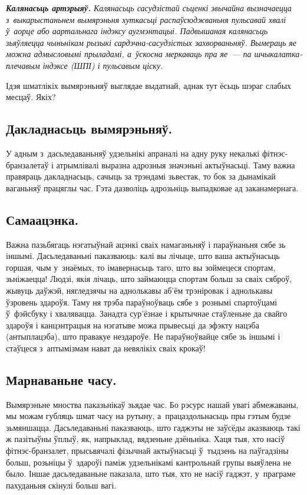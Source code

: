 \emph{\textbf{Калянасьць артэрыяў.} Калянасьць сасудзістай сьценкі звычайна вызначаецца з~выкарыстаньнем вымярэньня хуткасьці распаўсюджваньня пульсавай хвалі ў~аорце або аартальнага індэксу аугмэнтацыі. Падвышаная калянасьць зьяўляецца чыньнікам рызыкі сардэчна-сасудзістых захворваньняў. Вымераць яе можна адмысловымі прыладамі, а~ўскосна меркаваць пра яе~--- па шчыкалатка-плечавым індэксе (ШПІ) і пульсавым ціску.}

Ідэя шматлікіх вымярэньняў выглядае выдатнай, аднак тут ёсьць шэраг слабых месцаў. Якіх?

\subsection*{Дакладнасьць вымярэньняў.}

У адным з~дасьледаваньняў удзельнікі апраналі на адну руку некалькі фітнэс-бранзалетаў і атрымлівалі выразна адрозныя значэньні актыўнасьці. Таму важна правяраць дакладнасьць, сачыць за трэндамі зьвестак, то бок за дынамікай ваганьняў працяглы час. Гэта дазволіць адрозьніць выпадковае ад заканамернага.

\subsection*{Самаацэнка.}

Важна пазьбягаць нэгатыўнай ацэнкі сваіх намаганьняў і параўнаньня сябе зь іншымі. Дасьледаваньні паказваюць: калі вы лічыце, што ваша актыўнасьць горшая, чым у~знаёмых, то імавернасьць таго, што вы зоймецеся спортам, зьніжаецца! Людзі, якія лічаць, што займаюцца спортам больш за сваіх сяброў, жывуць даўжэй, нягледзячы на аднолькавы аб'ём трэніровак і аднолькавы ўзровень здароўя. Таму ня трэба параўноўваць сябе з~рознымі спартоўцамі ў~фэйсбуку і хвалявацца. Занадта сур'ёзнае і крытычнае стаўленьне да свайго здароўя і канцэнтрацыя на нэгатыве можа прывесьці да эфэкту нацэба (антыплацэба), што правакуе нездароўе. Не параўноўвайце сябе зь іншымі і стаўцеся з~аптымізмам нават да невялікіх сваіх крокаў!

\subsection*{Марнаваньне часу.}

Вымярэньне мноства паказьнікаў зьядае час. Бо рэсурс нашай увагі абмежаваны, мы можам губляць шмат часу на рутыну, а~працаздольнасьць пры гэтым будзе зьмяншацца. Дасьледаваньні паказваюць, што гаджэты не заўсёды аказваюць такі ж пазітыўны ўплыў, як, напрыклад, вядзеньне дзёньніка. Хаця тыя, хто насіў фітнэс-бранзалет, прысьвячалі фізычнай актыўнасьці ў~тыдзень на паўгадзіны больш, розьніцы ў~здароўі паміж удзельнікамі кантрольнай групы выяўлена не было. Іншае дасьледаваньне паказала, што тыя, хто не насіў гаджэт, у~праграме пахуданьня скінулі больш вагі.

